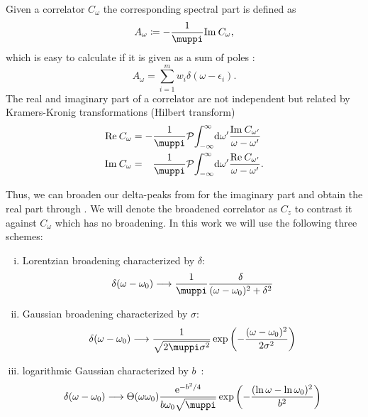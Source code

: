 Given a correlator $C_\omega$ the corresponding spectral part is defined as
\begin{equation}
    A_\omega \coloneq -\frac{1}{\muppi}\Im C_\omega,
\end{equation}
which is easy to calculate if it is given as a sum of poles :
\begin{equation}
    A_\omega = \sum_{i=1}^m w_i \delta(\omega - \epsilon_i).
    \label{eq:spectral-sum}
\end{equation}
The real and imaginary part of a correlator are not independent
but related by Kramers-Kronig transformations (Hilbert transform)
\begin{subequations}
    \begin{align}
        \Re C_\omega
         & =
        - \frac{1}{\muppi} \mathcal{P}\! \int_{-\infty}^\infty\! \md\omega'
        \frac{\Im C_{\omega'}}{\omega - \omega'}
        \label{eq:kramers-kronig-real} \\
        \Im C_\omega
         & =
        \phantom{-} \frac{1}{\muppi} \mathcal{P}\! \int_{-\infty}^\infty\! \md\omega'
        \frac{\Re C_{\omega'}}{\omega - \omega'}.
        \label{eq:kramers-kronig-imag}
    \end{align}
\end{subequations}

Thus, we can broaden our delta-peaks from 
for the imaginary part and obtain the real part through .
We will denote the broadened correlator as $C_z$
to contrast it against $C_\omega$ which has no broadening.
In this work we will use the following three schemes:
\begin{enumerate}[(i)]
    \item Lorentzian broadening characterized by $\delta$:%
          \label{item:lorentzian}
          \begin{equation}
              \delta(\omega - \omega_0)
              \longrightarrow
              \frac{1}{\muppi}\frac{\delta}{(\omega - \omega_0)^2 + \delta^2}
          \end{equation}
    \item Gaussian broadening characterized by $\sigma$:%
          \label{item:gaussian}
          \begin{equation}
              \delta(\omega - \omega_0)
              \longrightarrow
              \frac{1}{\sqrt{2\muppi \sigma^2}}\exp\left(-\frac{(\omega - \omega_0)^2}{2\sigma^2}\right)
          \end{equation}
    \item logarithmic Gaussian characterized by $b$~\cite{Bulla2008}:%
          \label{item:logarithmic-gaussian}
          \begin{equation}
              \delta(\omega - \omega_0)
              \longrightarrow
              \Theta(\omega\omega_0)\frac{\me^{-b^2/4}}{b\omega_0\sqrt{\muppi}}\exp\left(-\frac{(\ln\omega-\ln\omega_0)^2}{b^2}\right)
          \end{equation}
\end{enumerate}

